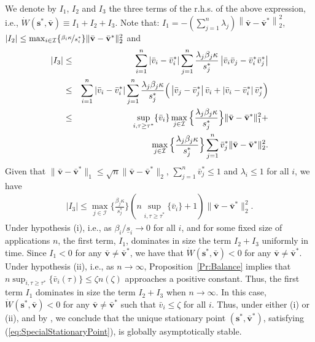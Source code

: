 \documentclass[letter,11pt]{article}
\begin{document}
We denote by $I_1$, $I_2$ and $I_3$ the three terms of the r.h.s. of the above expression, i.e., $\dot{W}({\mathbf{s}}^*,{\bar{\mathbf{v}}})\equiv I_1+I_2+I_3$. Note that:
$I_1 = - (\sum_{j=1}^{n}\lambda_j)\left\|{\bar{\mathbf{v}}} - {\bar{\mathbf{v}}}^*\right\|_2^2$,
${\left\vert {I_2} \right\vert} \leq \max_{i\in\mathcal{I}}\{\nicefrac{\beta_i\kappa}{s_i^*}\}\|{\bar{\mathbf{v}}}-{\bar{\mathbf{v}}}^*\|_2^2$
and
\begin{eqnarray*}
{\left\vert {I_3} \right\vert} & \leq & \sum_{i=1}^{n}|{\bar{v}}_i-{\bar{v}}_i^*|\sum_{j=1}^{n}\frac{\lambda_j\beta_j\kappa}{s_j^*}\left|{\bar{v}}_i{\bar{v}}_j - {\bar{v}}_i^*{\bar{v}}_j^* \right| \cr 
& \leq & \sum_{i=1}^{n}|{\bar{v}}_i-{\bar{v}}_i^*|\sum_{j=1}^{n}\frac{\lambda_j\beta_j\kappa}{s_j^*}\Big(\left|{\bar{v}}_j-{\bar{v}}_j^*\right| {\bar{v}}_i + \left|{\bar{v}}_i-{\bar{v}}_i^*\right| {\bar{v}}_j^* \Big) \cr 
& \leq & \sup_{i,\tau\geq{\tau^*}}\{{\bar{v}}_i\}\max_{j\in\mathcal{I}}\Big\{\frac{\lambda_j\beta_j\kappa}{s_j^*}\Big\}\|{\bar{\mathbf{v}}}-{\bar{\mathbf{v}}}^*\|_1^2 + \cr &&
\max_{j\in\mathcal{I}}\Big\{\frac{\lambda_j\beta_j\kappa}{s_j^*}\Big\}\sum_{j=1}^{n}{\bar{v}}_j^* \|{\bar{\mathbf{v}}}-{\bar{\mathbf{v}}}^*\|_2^2.
\end{eqnarray*}
Given that $\|{\bar{\mathbf{v}}}-{\bar{\mathbf{v}}}^*\|_1 \leq \sqrt{n}\|{\bar{\mathbf{v}}}-{\bar{\mathbf{v}}}^*\|_2$, $\sum_{j=1}^{n}{\bar{v}}_j^*\leq{1}$ and $\lambda_i \le 1$ for all $i$, we have
\begin{eqnarray*}
{\left\vert {I_3} \right\vert} \leq \max_{j\in\mathcal{I}}\Big\{\frac{\beta_j\kappa}{s_j^*}\Big\} \left( n \sup_{i,\tau\geq{\tau^*}}\{{\bar{v}}_i\} + 1 \right) \|{\bar{\mathbf{v}}}-{\bar{\mathbf{v}}}^*\|_2^2.
\end{eqnarray*}
Under hypothesis (i), i.e., as $\beta_i/\underline{s}_i\to{0}$ for all $i$, and for some fixed size of applications $n$, the first term, $I_1$, dominates in size the term $I_2+I_3$ uniformly in time. Since $I_1<0$ for any ${\bar{\mathbf{v}}}\neq{\bar{\mathbf{v}}}^*$, we have that $\dot{W}({\mathbf{s}}^*,{\bar{\mathbf{v}}})<0$ for any ${\bar{\mathbf{v}}}\neq{\bar{\mathbf{v}}}^*$. Under hypothesis (ii), i.e., as $n\to\infty$, Proposition~\ref{Pr:Balance} implies that $n\sup_{i,\tau\geq{\tau^*}}\{{\bar{v}}_i(\tau)\}\le \zeta n(\zeta)$ approaches a positive constant. Thus, the first term $I_1$ dominates in size the term $I_2+I_3$ when $n\to\infty$. In this case, $\dot{W}({\mathbf{s}}^*,{\bar{\mathbf{v}}})<0$ for any ${\bar{\mathbf{v}}}\neq{\bar{\mathbf{v}}}^*$ such that ${\bar{v}}_i \leq \zeta$ for all $i$. Thus, under either (i) or (ii), and by \cite[Theorem~3.2]{Khalil92}, we conclude that the unique stationary point $({\mathbf{s}}^*,{\bar{\mathbf{v}}}^*)$, satisfying (\ref{eq:SpecialStationaryPoint}), is globally asymptotically stable.
\end{document}

